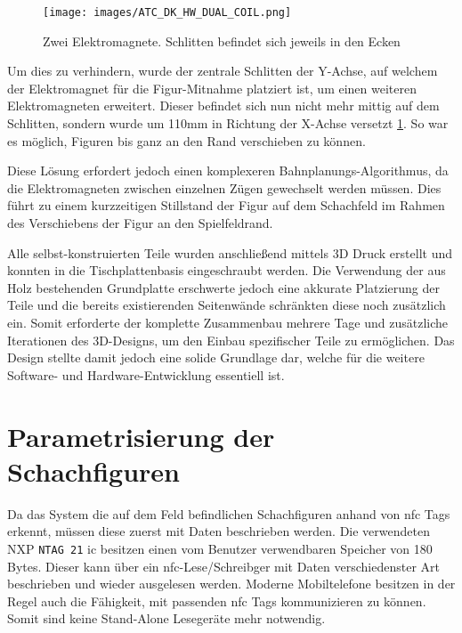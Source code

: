 \begin{figure}
\centering
\texttt{[image: images/ATC\_DK\_HW\_DUAL\_COIL.png]}
\caption{Zwei Elektromagnete. Schlitten befindet sich jeweils in den
Ecken \label{ATC_DK_HW_DUAL_COIL}}
\end{figure}

Um dies zu verhindern, wurde der zentrale Schlitten der Y-Achse, auf
welchem der Elektromagnet für die Figur-Mitnahme platziert ist, um einen
weiteren Elektromagneten erweitert. Dieser befindet sich nun nicht mehr
mittig auf dem Schlitten, sondern wurde um 110mm in Richtung der X-Achse
versetzt \ref{ATC_DK_HW_DUAL_COIL}. So war es möglich, Figuren bis ganz
an den Rand verschieben zu können.

Diese Lösung erfordert jedoch einen komplexeren
Bahnplanungs-Algorithmus, da die Elektromagneten zwischen einzelnen
Zügen gewechselt werden müssen. Dies führt zu einem kurzzeitigen
Stillstand der Figur auf dem Schachfeld im Rahmen des Verschiebens der
Figur an den Spielfeldrand.

Alle selbst-konstruierten Teile wurden anschließend mittels 3D Druck
erstellt und konnten in die Tischplattenbasis eingeschraubt werden. Die
Verwendung der aus Holz bestehenden Grundplatte erschwerte jedoch eine
akkurate Platzierung der Teile und die bereits existierenden Seitenwände
schränkten diese noch zusätzlich ein. Somit erforderte der komplette
Zusammenbau mehrere Tage und zusätzliche Iterationen des 3D-Designs, um
den Einbau spezifischer Teile zu ermöglichen. Das Design stellte damit
jedoch eine solide Grundlage dar, welche für die weitere Software- und
Hardware-Entwicklung essentiell ist.

\hypertarget{parametrisierung-der-schachfiguren}{%
\section{Parametrisierung der
Schachfiguren}\label{parametrisierung-der-schachfiguren}}

Da das System die auf dem Feld befindlichen Schachfiguren anhand von
\gls{nfc} Tags erkennt, müssen diese zuerst mit Daten beschrieben
werden. Die verwendeten NXP
\passthrough{\lstinline!NTAG 21!}\cite{nxpntag21} \gls{ic} besitzen
einen vom Benutzer verwendbaren Speicher von 180 Bytes. Dieser kann über
ein \gls{nfc}-Lese/Schreibger mit Daten verschiedenster Art beschrieben
und wieder ausgelesen werden. Moderne Mobiltelefone besitzen in der
Regel auch die Fähigkeit, mit passenden \gls{nfc} Tags kommunizieren zu
können. Somit sind keine Stand-Alone Lesegeräte mehr notwendig.

